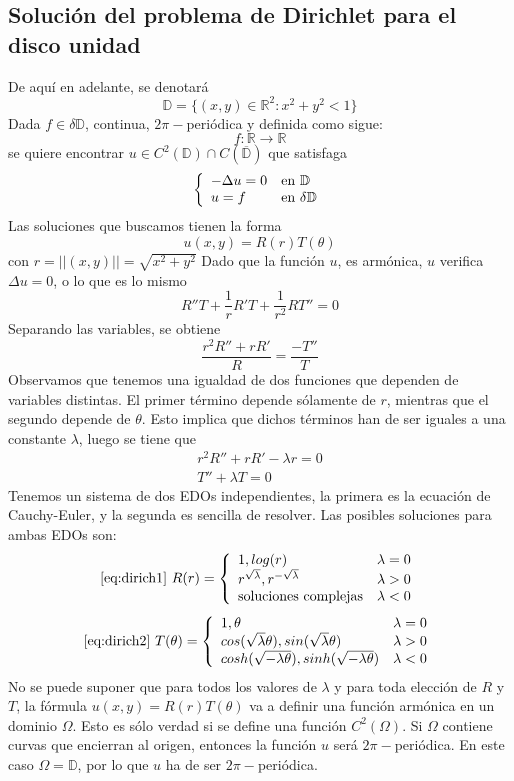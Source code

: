 \subsection{Solución del problema de Dirichlet para el disco unidad}
\noindent De aquí en adelante, se denotará
$$\mathbb{D} = \{(x,y)\in \mathbb{R}^2: x^2+y^2 < 1\}$$
Dada $f\in\delta\mathbb{D}$, continua, $2\pi-$periódica y definida como sigue:
$$f:\mathbb{R}\longrightarrow\mathbb{R}$$
se quiere encontrar $u\in C^2(\mathbb{D})\cap C(\mathbb{\overline{\mathbb{D}}})$ que satisfaga
\begin{equation*}
\left\{
\begin{array}{l l}
-\Delta u = 0 & \text{en } \mathbb{D}\\
u=f & \text{en } \delta\mathbb{D}
\end{array}
\right.
\end{equation*}
Las soluciones que buscamos tienen la forma
$$u(x,y) = R(r)T(\theta)$$
con $r=||(x,y)||=\sqrt{x^2+y^2}$
Dado que la función $u$, es armónica, $u$ verifica $\Delta u = 0$, o lo que es lo mismo
$$R''T+\frac{1}{r}R'T+\frac{1}{r^2}RT'' = 0$$
Separando las variables, se obtiene
$$\frac{r^2R''+rR'}{R}=\frac{-T''}{T}$$
Observamos que tenemos una igualdad de dos funciones que dependen de variables distintas. El primer término depende sólamente de $r$, mientras que el segundo depende de $\theta$. Esto implica que dichos términos han de ser iguales a una constante $\lambda$, luego se tiene que
\begin{align}\label{eq:dirich1}
r^2R''+rR'-\lambda r = 0\\\label{eq:dirich2}
T''+\lambda T = 0
\end{align}
Tenemos un sistema de dos EDOs independientes, la primera es la ecuación de Cauchy-Euler, y la segunda es sencilla de resolver.
Las posibles soluciones para ambas EDOs son:
\begin{equation*}
\eqref{eq:dirich1}\ R(r) = \left\{
\begin{array}{l l}
1,log(r) & \lambda=0\\
r^{\sqrt{\lambda}}, r^{-\sqrt{\lambda}} & \lambda > 0\\
\text{soluciones complejas} & \lambda < 0
\end{array}
\right.
\end{equation*}
\begin{equation*}
\eqref{eq:dirich2}\ T(\theta) = \left\{
\begin{array}{l l}
1,\theta & \lambda=0\\
cos(\sqrt{\lambda}\theta), sin(\sqrt{\lambda}\theta) & \lambda > 0\\
cosh(\sqrt{-\lambda\theta}), sinh(\sqrt{-\lambda\theta}) & \lambda < 0
\end{array}
\right.
\end{equation*}
No se puede suponer que para todos los valores de $\lambda$ y para toda elección de $R$ y $T$, la fórmula $u(x,y) = R(r)T(\theta)$ va a definir una función armónica en un dominio $\Omega$. Esto es sólo verdad si se define una función $C^2(\Omega)$. Si $\Omega$ contiene curvas que encierran al origen, entonces la función $u$ será $2\pi-$periódica. En este caso $\Omega=\mathbb{D}$, por lo que $u$ ha de ser $2\pi-$periódica.

